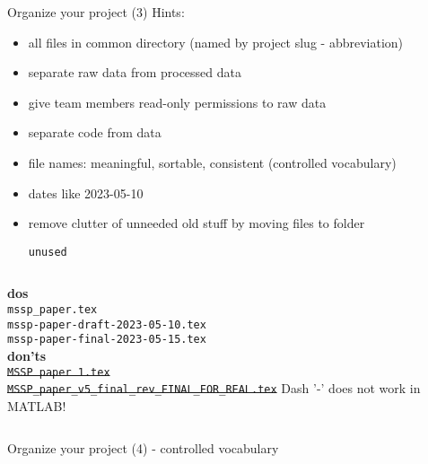 \documentclass[10pt,aspectratio=169,notes]{beamer} %
\begin{document}
\begin{frame}[t,label=frame11]{Organize your project (3)}
Hints:
\begin{itemize}
	\item all files in common directory (named by project slug - abbreviation) 
	\item separate raw data from processed data
	\item give team members read-only permissions to raw data
	\item separate code from data
	\item file names: meaningful, sortable, consistent (controlled vocabulary)
	\item dates like 2023-05-10
	\item remove clutter of unneeded old stuff by moving files to folder 
	\texttt{unused}
\end{itemize}	
\begin{columns}[T]
	\hspace{5mm}
	\textbf{dos}\\
	\texttt{mssp\_paper.tex}\\
	\texttt{mssp-paper-draft-2023-05-10.tex}\\
	\texttt{mssp-paper-final-2023-05-15.tex}\\
	\textbf{don'ts}\\
	\sout{\texttt{MSSP paper 1.tex}}\\
	\sout{\texttt{MSSP\_paper\_v5\_final\_rev\_FINAL\_FOR\_REAL.tex}}
	\alert{Dash '-' does not work in MATLAB!}
\end{columns}

\end{frame}
\begin{frame}[t,label=frame12]{Organize your project (4) - controlled vocabulary}

\end{frame}
\note{
}
\end{document}
